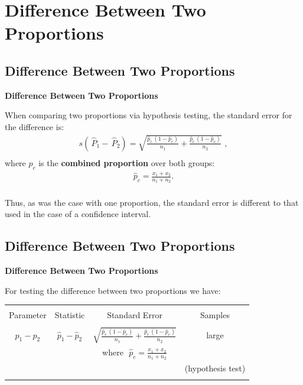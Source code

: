 \documentclass[compress]{beamer}        %
\makeatletter
\newcommand{\tcb}{\textcolor{beamer@blendedblue}}
\makeatother
\begin{document}
\section{Difference Between Two Proportions}
\subsection{Difference Between Two Proportions}
\begin{frame}{\bf \tcb{Difference Between Two Proportions}}

When comparing two proportions via hypothesis testing, the standard error for the difference is:\\[-0.1cm]
\begin{align*}
\boxed{s(\,\widehat{\!P}_1 - \,\widehat{\!P}_2) = \sqrt{\frac{\hat p_c \, (1-\hat p_c)}{n_1}+\frac{\hat p_c \, (1-\hat p_c)}{n_2}}\,}\,,\\[-0.1cm]
\end{align*}
where $\hat p_c$ is the {\bf combined proportion} over both groups:\\
\begin{align*}
\boxed{\hat p_c = \frac{x_1+x_2}{n_1+n_2}}.\\[-0.2cm]
\end{align*}

Thus, as was the case with one proportion, the standard error is different to that used in the case of a confidence interval.
\end{frame}


\subsection{Difference Between Two Proportions}
\begin{frame}{\bf \tcb{Difference Between Two Proportions}}

For testing the difference between two proportions we have:\\[0.3cm]

\begin{center}
\begin{tabular}{|c|c|c|c|}
\hline
&&&\\[-0.1cm]
Parameter & Statistic & Standard Error & Samples\\[0.3cm]
\hline
&&&\\[-0.1cm]
$p_1-p_2$ & $\hat p_1 - \hat p_2$  & ${\displaystyle\sqrt{\frac{\hat p_c\,(1-\hat p_c)}{n_1}+\frac{\hat p_c\,(1-\hat p_c)}{n_2}}}$ & large \\[0.8cm]
&&where\,\, ${\displaystyle \hat p_c = \frac{x_1+x_2}{n_1+n_2}}$&\\[-1.3cm]
&&& {\footnotesize(hypothesis test)}\\[1.1cm]
\hline
\multicolumn{4}{c}{}\\[0.5cm]
\end{tabular}
\end{center}



\end{frame}
\end{document}
